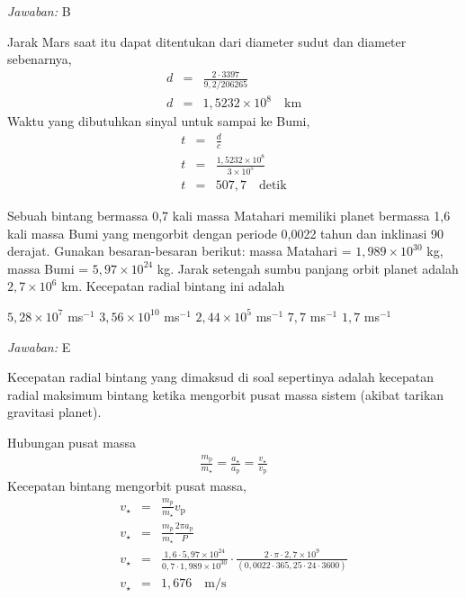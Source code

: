 \documentclass[11pt,fleqn]{exam}
\begin{document}
\begin{questions}
\bigskip
\textit{Jawaban: } B

Jarak Mars saat itu dapat ditentukan dari diameter sudut dan diameter sebenarnya,
\begin{eqnarray*}
    d &=& \frac{2 \cdot 3397}{9,2 / 206265}\\
    d &=& 1,5232 \times 10^{8} \quad \text{km}
\end{eqnarray*}
Waktu yang dibutuhkan sinyal untuk sampai ke Bumi, 
\begin{eqnarray*}
    t &=& \frac{d}{c}\\
    t &=& \frac{1,5232 \times 10^{8}}{3 \times 10^5}\\
    t &=& 507,7 \quad \text{detik}
\end{eqnarray*}

\vspace{0.5cm}
\question Sebuah bintang bermassa 0,7 kali massa Matahari memiliki planet bermassa 1,6 kali massa Bumi yang mengorbit dengan periode 0,0022 tahun dan inklinasi 90 derajat. Gunakan besaran-besaran berikut: massa Matahari = $1,989 \times 10^{30}$ kg, massa Bumi = $5,97 \times 10^{24}$ kg. Jarak setengah sumbu panjang orbit planet adalah $2,7 \times 10^6$ km. Kecepatan radial bintang ini adalah

\begin{choices}
\choice $5,28 \times 10^7$ ms$^{-1}$
\choice $3,56 \times 10^{10}$ ms$^{-1}$
\choice $2,44 \times 10^5$ ms$^{-1}$
\choice $7,7$ ms$^{-1}$
\choice $1,7$ ms$^{-1}$
\end{choices}

\bigskip
\textit{Jawaban: } E

Kecepatan radial bintang yang dimaksud di soal sepertinya adalah kecepatan radial maksimum bintang ketika mengorbit pusat massa sistem (akibat tarikan gravitasi planet).

Hubungan pusat massa
\begin{eqnarray*}
    \frac{m_\text{p}}{m_\star} = \frac{a_\star}{a_\text{p}} = \frac{v_\star}{v_\text{p}}
\end{eqnarray*}
Kecepatan bintang mengorbit pusat massa,
\begin{eqnarray*}
    v_\star &=& \frac{m_p}{m_\star} v_\text{p}\\
    v_\star &=& \frac{m_p}{m_\star} \frac{2 \pi a_\text{p}}{P}\\
    v_\star &=& \frac{1,6 \cdot 5,97 \times 10^{24}}{0,7 \cdot 1,989 \times 10^{30}} \cdot \frac{2 \cdot \pi \cdot 2,7 \times 10^9 }{(0,0022 \cdot 365,25 \cdot 24 \cdot 3600)}\\
    v_\star &=& 1,676 \quad \text{m/s}
\end{eqnarray*}


\end{questions}
\end{document}
